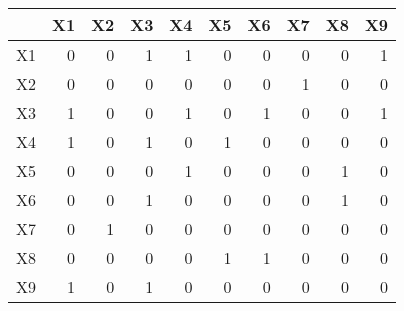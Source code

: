 \begin{tabular}{lrrrrrrrrr}
\toprule
{} &  X1 &  X2 &  X3 &  X4 &  X5 &  X6 &  X7 &  X8 &  X9 \\
\midrule
X1 &   0 &   0 &   1 &   1 &   0 &   0 &   0 &   0 &   1 \\
X2 &   0 &   0 &   0 &   0 &   0 &   0 &   1 &   0 &   0 \\
X3 &   1 &   0 &   0 &   1 &   0 &   1 &   0 &   0 &   1 \\
X4 &   1 &   0 &   1 &   0 &   1 &   0 &   0 &   0 &   0 \\
X5 &   0 &   0 &   0 &   1 &   0 &   0 &   0 &   1 &   0 \\
X6 &   0 &   0 &   1 &   0 &   0 &   0 &   0 &   1 &   0 \\
X7 &   0 &   1 &   0 &   0 &   0 &   0 &   0 &   0 &   0 \\
X8 &   0 &   0 &   0 &   0 &   1 &   1 &   0 &   0 &   0 \\
X9 &   1 &   0 &   1 &   0 &   0 &   0 &   0 &   0 &   0 \\
\bottomrule
\end{tabular}
